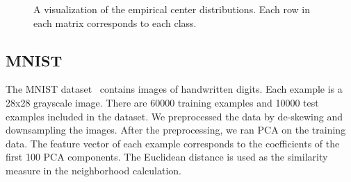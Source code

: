\documentclass{article}
\begin{document}
\begin{figure}[tb]
\vskip 0.2in
\begin{center}
\centering
{}
\caption{A visualization of the empirical center distributions. Each row
  in each matrix corresponds to each class. }
\label{fig:matrix}
\end{center}
\vskip -0.2in
\end{figure}


\subsection{MNIST}
The MNIST dataset~\cite{Lecun1998} contains images of handwritten
digits. Each example is a 28x28 grayscale image. There are 60000
training examples and 10000 test examples included in the dataset. We
preprocessed the data by de-skewing and downsampling the images. After
the preprocessing, we ran PCA on the training data. The feature vector
of each example corresponds to the coefficients of the first 100 PCA
components. The Euclidean distance is used as the similarity measure
in the neighborhood calculation.
\end{document}
